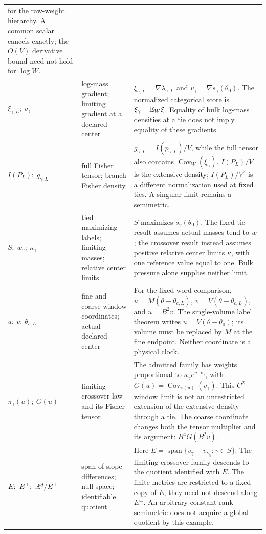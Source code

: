 \begin{longtable}{@{}>{\raggedright\arraybackslash}p{}
>{\raggedright\arraybackslash}p{}
>{\raggedright\arraybackslash}p{}@{}}
for the raw-weight hierarchy. A common scalar cancels exactly; the
\(O(V)\) derivative bound need not hold for \(\log W\). \\
\(\xi_{\gamma,L};\ v_\gamma\) &
log-mass gradient; limiting gradient at a declared center &
\(\xi_{\gamma,L}=\nabla\lambda_{\gamma,L}\) and
\(v_\gamma=\nabla s_\gamma(\theta_0)\).
The normalized categorical score is \(\xi_\gamma-\mathbb E_W\xi\).
Equality of bulk log-mass densities at a tie does not imply equality
of these gradients. \\
\(I(P_L);\ g_{\gamma,L}\) &
full Fisher tensor; branch Fisher density &
\(g_{\gamma,L}=I(p_{\gamma,L})/V\), while the full tensor also contains
\(\operatorname{Cov}_W(\xi_\gamma)\).
\(I(P_L)/V\) is the extensive density; \(I(P_L)/V^2\) is a different
normalization used at fixed ties. A singular limit remains a semimetric. \\
\(S;\ w_\gamma;\ \kappa_\gamma\) &
tied maximizing labels; limiting masses; relative center limits &
\(S\) maximizes \(s_\gamma(\theta_0)\).
The fixed-tie result assumes actual masses tend to \(w\); the crossover
result instead assumes positive relative center limits \(\kappa\),
with one reference value equal to one. Bulk pressure alone supplies neither
limit. \\
\(u;\ v;\ \theta_{c,L}\) &
fine and coarse window coordinates; actual declared center &
For the fixed-word comparison, \(u=M(\theta-\theta_{c,L})\),
\(v=V(\theta-\theta_{c,L})\), and \(u=B^2v\).
The single-volume label theorem writes \(u=V(\theta-\theta_0)\);
its volume must be replaced by \(M\) at the fine endpoint.
Neither coordinate is a physical clock. \\
\(\pi_\gamma(u);\ G(u)\) &
limiting crossover law and its Fisher tensor &
The admitted family has weights proportional to
\(\kappa_\gamma e^{u\cdot v_\gamma}\), with
\(G(u)=\operatorname{Cov}_{\pi(u)}(v_\gamma)\).
This \(C^2\) window limit is not an unrestricted extension of the
extensive density through a tie. The coarse coordinate changes both
the tensor multiplier and its argument: \(B^4G(B^2v)\). \\
\(E;\ E^\perp;\ \R^d/E^\perp\) &
span of slope differences; null space; identifiable quotient &
Here \(E=\operatorname{span}\{v_\gamma-v_{\gamma_0}:\gamma\in S\}\).
The limiting crossover family descends to the quotient identified with
\(E\). The finite metrics are restricted to a fixed copy of \(E\);
they need not descend along \(E^\perp\). An arbitrary constant-rank
semimetric does not acquire a global quotient by this example. \\

\end{longtable}
